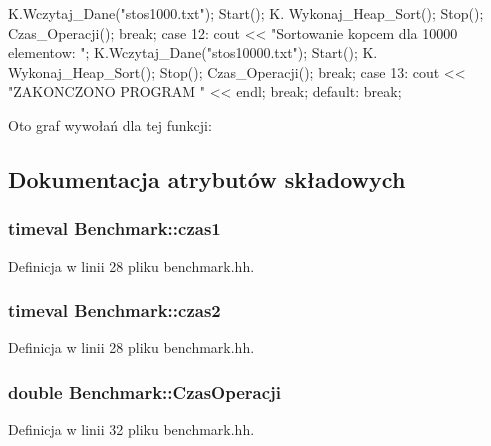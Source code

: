 \begin{DoxyCode}
{{                        K.Wczytaj_Dane("stos1000.txt"); Start(); K.
      Wykonaj_Heap_Sort(); Stop(); Czas_Operacji();
                        break;  
                case 12: 
                        cout << "Sortowanie kopcem dla 10000 elementow: ";
                        K.Wczytaj_Dane("stos10000.txt"); Start(); K.
      Wykonaj_Heap_Sort(); Stop(); Czas_Operacji();
                        break;                  
                case 13:
                                cout << "ZAKONCZONO PROGRAM " << endl;
                                break;
                default:
                                break;
        }
}
\end{DoxyCode}


\-Oto graf wywołań dla tej funkcji\-:




\subsection{\-Dokumentacja atrybutów składowych}
\hypertarget{class_benchmark_a461847eb9a01e511e19af6cd7bcc057e}{
\subsubsection[{czas1}]{\setlength{\rightskip}{0pt plus 5cm}timeval {\bf \-Benchmark\-::czas1}}}\label{class_benchmark_a461847eb9a01e511e19af6cd7bcc057e}


\-Definicja w linii 28 pliku benchmark.\-hh.

\hypertarget{class_benchmark_a56ec92a30b650825403d14907a321eea}{
\subsubsection[{czas2}]{\setlength{\rightskip}{0pt plus 5cm}timeval {\bf \-Benchmark\-::czas2}}}\label{class_benchmark_a56ec92a30b650825403d14907a321eea}


\-Definicja w linii 28 pliku benchmark.\-hh.

\hypertarget{class_benchmark_accd4af9649210ce216db513c0676c401}{
\subsubsection[{\-Czas\-Operacji}]{\setlength{\rightskip}{0pt plus 5cm}double {\bf \-Benchmark\-::\-Czas\-Operacji}}}\label{class_benchmark_accd4af9649210ce216db513c0676c401}


\-Definicja w linii 32 pliku benchmark.\-hh.

